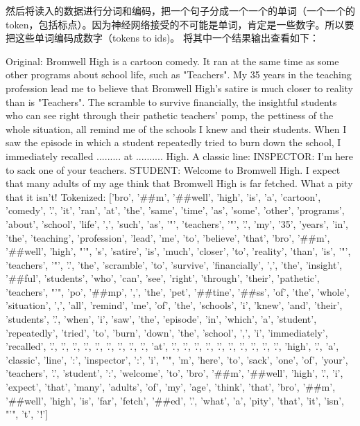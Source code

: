 \documentclass[a4paper,AutoFakeBold,AutoFakeSlant]{ctexart}
\begin{document}
然后将读入的数据进行分词和编码，把一个句子分成一个一个的单词（一个一个的token，包括标点）。因为神经网络接受的不可能是单词，肯定是一些数字。所以要把这些单词编码成数字（tokens to ids)。
将其中一个结果输出查看如下：
\begin{framed}
  Original:  Bromwell High is a cartoon comedy. It ran at the same time as some other programs about school life, such as "Teachers". My 35 years in the teaching profession lead me to believe that Bromwell High's satire is much closer to reality than is "Teachers". The scramble to survive financially, the insightful students who can see right through their pathetic teachers' pomp, the pettiness of the whole situation, all remind me of the schools I knew and their students. When I saw the episode in which a student repeatedly tried to burn down the school, I immediately recalled ......... at .......... High. A classic line: INSPECTOR: I'm here to sack one of your teachers. STUDENT: Welcome to Bromwell High. I expect that many adults of my age think that Bromwell High is far fetched. What a pity that it isn't!
Tokenized:  ['bro', '\#\#m', '\#\#well', 'high', 'is', 'a', 'cartoon', 'comedy', '.', 'it', 'ran', 'at', 'the', 'same', 'time', 'as', 'some', 'other', 'programs', 'about', 'school', 'life', ',', 'such', 'as', '"', 'teachers', '"', '.', 'my', '35', 'years', 'in', 'the', 'teaching', 'profession', 'lead', 'me', 'to', 'believe', 'that', 'bro', '\#\#m', '\#\#well', 'high', "'", 's', 'satire', 'is', 'much', 'closer', 'to', 'reality', 'than', 'is', '"', 'teachers', '"', '.', 'the', 'scramble', 'to', 'survive', 'financially', ',', 'the', 'insight', '\#\#ful', 'students', 'who', 'can', 'see', 'right', 'through', 'their', 'pathetic', 'teachers', "'", 'po', '\#\#mp', ',', 'the', 'pet', '\#\#tine', '\#\#ss', 'of', 'the', 'whole', 'situation', ',', 'all', 'remind', 'me', 'of', 'the', 'schools', 'i', 'knew', 'and', 'their', 'students', '.', 'when', 'i', 'saw', 'the', 'episode', 'in', 'which', 'a', 'student', 'repeatedly', 'tried', 'to', 'burn', 'down', 'the', 'school', ',', 'i', 'immediately', 'recalled', '.', '.', '.', '.', '.', '.', '.', '.', '.', 'at', '.', '.', '.', '.', '.', '.', '.', '.', '.', '.', 'high', '.', 'a', 'classic', 'line', ':', 'inspector', ':', 'i', "'", 'm', 'here', 'to', 'sack', 'one', 'of', 'your', 'teachers', '.', 'student', ':', 'welcome', 'to', 'bro', '\#\#m', '\#\#well', 'high', '.', 'i', 'expect', 'that', 'many', 'adults', 'of', 'my', 'age', 'think', 'that', 'bro', '\#\#m', '\#\#well', 'high', 'is', 'far', 'fetch', '\#\#ed', '.', 'what', 'a', 'pity', 'that', 'it', 'isn', "'", 't', '!']

\end{framed}
\end{document}
